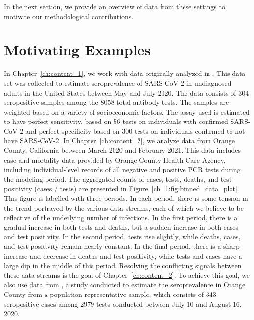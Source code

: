 In the next section, we provide an overview of data from these settings to motivate our methodological contributions.

\section{Motivating Examples}
\label{sec:motivating_examples}

In Chapter~\ref{ch:content_1}, we work with data originally analyzed in \citet{Kali:2021}.
This data set was collected to estimate seroprevalence of SARS-CoV-2 in undiagnosed adults in the United States between May and July 2020.
The data consists of 304 seropositive samples among the 8058 total antibody tests.
The samples are weighted based on a variety of socioeconomic factors. 
 The assay used is estimated to have perfect sensitivity, based on 56 tests on individuals with confirmed SARS-CoV-2 and perfect specificity based on 300 tests on individuals confirmed to not have SARS-CoV-2.
In Chapter~\ref{ch:content_2}, we analyze data from Orange County, California between March 2020 and February 2021.
This data includes case and mortality data provided by Orange County Health Care Agency, including individual-level records of all negative and positive PCR tests during the modeling period.
The aggregated counts of cases, tests, deaths, and test-positivity (cases / tests) are presented in Figure~\ref{ch_1:fig:binned_data_plot}.
This figure is labelled with three periods.
In each period, there is some tension in the trend portrayed by the various data streams, each of which we believe to be reflective of the underlying number of infections.
In the first period, there is a gradual increase in both tests and deaths, but a sudden increase in both cases and test positivity.
In the second period, tests rise slightly, while deaths, cases, and test positivity remain nearly constant.
In the final period, there is a sharp increase and decrease in deaths and test positivity, while tests and cases have a large dip in the middle of this period.
Resolving the conflicting signals between these data streams is the goal of Chapter~\ref{ch:content_2}.
To achieve this goal, we also use data from , a study conducted to estimate the seroprevalence in Orange County from a population-representative sample, which consists of 343 seropositive cases among 2979 tests conducted between July 10 and August 16, 2020.

